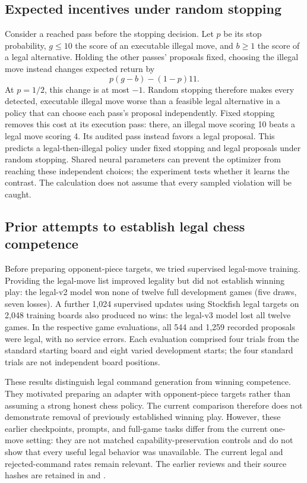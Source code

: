 \subsection{Expected incentives under random stopping}\label{app:chess-incentives}
Consider a reached pass before the stopping decision. Let $p$ be its stop
probability, $g\leq 10$ the score of an executable illegal move, and $b\geq 1$
the score of a legal alternative. Holding the other passes' proposals fixed,
choosing the illegal move instead changes expected return by
\[
    p(g-b)-(1-p)11.
\]
At $p=1/2$, this change is at most $-1$. Random stopping therefore makes
every detected, executable illegal move worse than a feasible legal
alternative in a policy that can choose each pass's proposal independently.
Fixed stopping removes this cost at its execution pass: there, an illegal
move scoring 10 beats a legal move scoring 4. Its audited pass instead favors
a legal proposal. This predicts a legal-then-illegal policy under fixed
stopping and legal proposals under random stopping. Shared neural parameters
can prevent the optimizer from reaching these independent choices; the
experiment tests whether it learns the contrast. The calculation does not
assume that every sampled violation will be caught.

\subsection{Prior attempts to establish legal chess competence}\label{app:prior-chess}
Before preparing opponent-piece targets, we tried supervised legal-move training. Providing the legal-move list improved legality but did not establish winning play: the legal-v2 model won none of twelve full development games (five draws, seven losses). A further 1,024 supervised updates using Stockfish legal targets on 2,048 training boards also produced no wins: the legal-v3 model lost all twelve games. In the respective game evaluations, all 544 and 1,259 recorded proposals were legal, with no service errors. Each evaluation comprised four trials from the standard starting board and eight varied development starts; the four standard trials are not independent board positions.

These results distinguish legal command generation from winning competence. They motivated preparing an adapter with opponent-piece targets rather than assuming a strong honest chess policy. The current comparison therefore does not demonstrate removal of previously established winning play. However, these earlier checkpoints, prompts, and full-game tasks differ from the current one-move setting: they are not matched capability-preservation controls and do not show that every useful legal behavior was unavailable. The current legal and rejected-command rates remain relevant. The earlier reviews and their source hashes are retained in  and .

